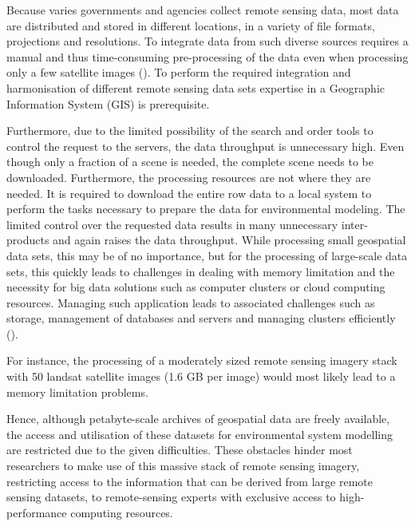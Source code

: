 Because varies governments and agencies collect remote sensing data, most data are distributed and stored in different locations, in a variety of file formats, projections and resolutions. To integrate data from such diverse sources requires a manual and thus time-consuming pre-processing of the data even when processing only a few satellite images (\cite{schell2000geodata}). To perform the required integration and harmonisation of different remote sensing data sets expertise in a Geographic Information System (GIS) is prerequisite.

Furthermore, due to the limited possibility of the search and order tools to control the request to the servers, the data throughput is unnecessary high. Even though only a fraction of a scene is needed, the complete scene needs to be downloaded. Furthermore, the processing resources are not where they are needed. It is required to download the entire row data to a local system to perform the tasks necessary to prepare the data for environmental modeling. The limited control over the requested data results in many unnecessary inter-products and again raises the data throughput. While processing small geospatial data sets, this may be of no importance, but for the processing of large-scale data sets, this quickly leads to challenges in dealing with memory limitation and the necessity for big data solutions such as computer clusters or cloud computing resources.
Managing such application leads to associated challenges such as storage, management of databases and servers and managing clusters efficiently (\cite{gorelick2017google}). 

For instance, the processing of a moderately sized remote sensing imagery stack with 50 landsat satellite images (1.6 GB per image) would most likely lead to a memory limitation problems.

Hence, although petabyte-scale archives of geospatial data are freely available, the access and utilisation of these datasets for environmental system modelling are restricted due to the given difficulties. 
These obstacles hinder most researchers to make use of this massive stack of remote sensing imagery, restricting access to the information that can be derived from large remote sensing datasets, to remote-sensing experts with exclusive access to high-performance computing resources.



\subsection{}


